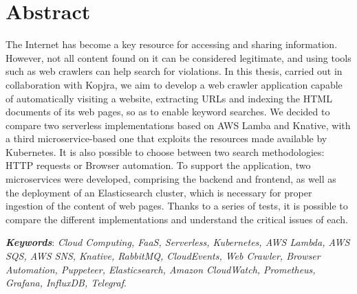 \documentclass[../thesis.tex]{subfiles}
\begin{document}
    \cleardoublepage
    \begingroup
    \let\clearpage\relax
    \let\cleardoublepage\relax
    \chapter*{Abstract}
    The Internet has become a key resource for accessing and sharing information. However, not all content found on it can be considered legitimate, and using tools such as web crawlers can help search for violations. In this thesis, carried out in collaboration with Kopjra, we aim to develop a web crawler application capable of automatically visiting a website, extracting URLs and indexing the HTML documents of its web pages, so as to enable keyword searches. We decided to compare two serverless implementations based on AWS Lamba and Knative, with a third microservice-based one that exploits the resources made available by Kubernetes. It is also possible to choose between two search methodologies: HTTP requests or Browser automation. To support the application, two microservices were developed, comprising the backend and frontend, as well as the deployment of an Elasticsearch cluster, which is necessary for proper ingestion of the content of web pages. Thanks to a series of tests, it is possible to compare the different implementations and understand the critical issues of each.
    
    \endgroup

    \vfill

    \noindent
    \textit{\textbf{Keywords}}: \textit{Cloud Computing, FaaS, Serverless, Kubernetes, AWS Lambda, AWS SQS, AWS SNS, Knative, RabbitMQ, CloudEvents, Web Crawler, Browser Automation, Puppeteer, Elasticsearch, Amazon CloudWatch, Prometheus, Grafana, InfluxDB, Telegraf}.
\end{document}
